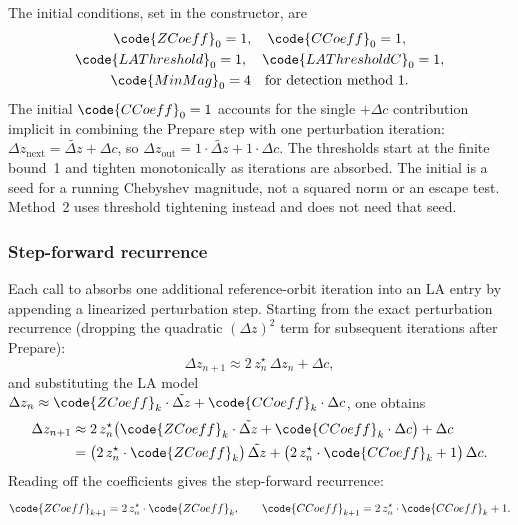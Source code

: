 The initial conditions, set in the  constructor, are
\[
\begin{gathered}
\code{ZCoeff}_0 = 1,\quad \code{CCoeff}_0 = 1,
\\
\code{LAThreshold}_0 = 1,\quad \code{LAThresholdC}_0 = 1,
\\
\code{MinMag}_0 = 4\quad\text{for detection method 1}.
\end{gathered}
\]
The initial \(\code{CCoeff}_0 = 1\) accounts for the single \(+\Delta c\)
contribution implicit in combining the Prepare step with one perturbation
iteration: \(\Delta z_\mathrm{next} = \tilde{\Delta z} + \Delta c\), so
\(\Delta z_\mathrm{out} = 1\cdot\tilde{\Delta z} + 1\cdot\Delta c\).
The thresholds start at the finite bound~1 and tighten monotonically
as iterations are absorbed. The initial  is a seed for a
running Chebyshev magnitude, not a squared norm or an escape test.
Method~2 uses threshold tightening instead and does not need that seed.

\subsubsection{Step-forward recurrence}
\label{sec:la-step-forward}

Each call to  absorbs one additional reference-orbit
iteration into an LA entry by appending a linearized perturbation step.
Starting from the exact perturbation recurrence (dropping the quadratic
\((\Delta z)^2\) term for subsequent iterations after Prepare):
\[
\Delta z_{n+1} \approx 2\,z_n^\star\,\Delta z_n + \Delta c,
\]
and substituting the LA model
\(\Delta z_n \approx \code{ZCoeff}_k\cdot\tilde{\Delta z}
                    + \code{CCoeff}_k\cdot\Delta c\), one obtains
\begin{align}
\Delta z_{n+1}
  &\approx 2\,z_n^\star\bigl(
      \code{ZCoeff}_k\cdot\tilde{\Delta z}
    + \code{CCoeff}_k\cdot\Delta c
    \bigr) + \Delta c \\
  &= \bigl(2\,z_n^\star\cdot\code{ZCoeff}_k\bigr)\,\tilde{\Delta z}
   + \bigl(2\,z_n^\star\cdot\code{CCoeff}_k + 1\bigr)\,\Delta c.
\end{align}
Reading off the coefficients gives the step-forward recurrence:
\begin{equation}
\code{ZCoeff}_{k+1} = 2\,z_n^\star\cdot\code{ZCoeff}_k,\qquad
\code{CCoeff}_{k+1} = 2\,z_n^\star\cdot\code{CCoeff}_k + 1.
\label{eq:la-step}
\end{equation}

